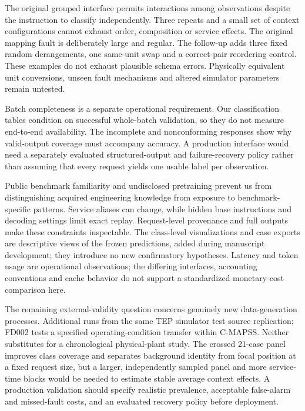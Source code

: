 \documentclass[11pt,a4paper]{article}
\begin{document}
The original grouped interface permits interactions among observations despite the instruction to classify independently. Three repeats and a small set of context configurations cannot exhaust order, composition or service effects. The original mapping fault is deliberately large and regular. The follow-up adds three fixed random derangements, one same-unit swap and a correct-pair reordering control. These examples do not exhaust plausible schema errors. Physically equivalent unit conversions, unseen fault mechanisms and altered simulator parameters remain untested.

Batch completeness is a separate operational requirement. Our classification tables condition on successful whole-batch validation, so they do not measure end-to-end availability. The incomplete and nonconforming responses show why valid-output coverage must accompany accuracy. A production interface would need a separately evaluated structured-output and failure-recovery policy rather than assuming that every request yields one usable label per observation.

Public benchmark familiarity and undisclosed pretraining prevent us from distinguishing acquired engineering knowledge from exposure to benchmark-specific patterns. Service aliases can change, while hidden base instructions and decoding settings limit exact replay. Request-level provenance and full outputs make these constraints inspectable. The class-level visualizations and case exports are descriptive views of the frozen predictions, added during manuscript development; they introduce no new confirmatory hypotheses. Latency and token usage are operational observations; the differing interfaces, accounting conventions and cache behavior do not support a standardized monetary-cost comparison here.

The remaining external-validity question concerns genuinely new data-generation processes. Additional runs from the same TEP simulator test source replication; FD002 tests a specified operating-condition transfer within C-MAPSS. Neither substitutes for a chronological physical-plant study. The crossed 21-case panel improves class coverage and separates background identity from focal position at a fixed request size, but a larger, independently sampled panel and more service-time blocks would be needed to estimate stable average context effects. A production validation should specify realistic prevalence, acceptable false-alarm and missed-fault costs, and an evaluated recovery policy before deployment.
\end{document}
